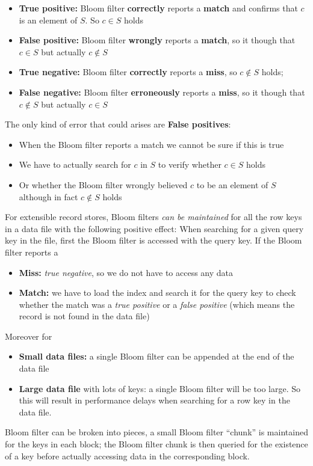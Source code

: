 \begin{itemize}
    \item \textbf{True positive:} Bloom filter \textbf{correctly} reports a \textbf{match} and confirms that \(c\) is an element of \(S\). So \(c \in S\) holds
    \item \textbf{False positive:} Bloom filter \textbf{wrongly} reports a \textbf{match}, so it though that\(c \in S\) but actually \(c \notin S\)
    \item \textbf{True negative:} Bloom filter \textbf{correctly} reports a \textbf{miss}, so \(c \notin S\) holds;
    \item \textbf{False negative:} Bloom filter \textbf{erroneously} reports a \textbf{miss}, so it though that\(c \notin S\) but actually \(c \in S\)
\end{itemize}
The only kind of error that could arises are \textbf{False positives}:
\begin{itemize}
    \item When the Bloom filter reports a match we cannot be sure if this is true
    \item We have to actually search for \(c\) in \(S\) to verify whether \(c \in S\) holds
    \item Or whether the Bloom filter wrongly believed \(c\) to be an element of \(S\) although in fact \(c \notin S\) holds
\end{itemize}

For extensible record stores, Bloom filters \textit{can be maintained} for all the row keys in a data file with the following positive effect:
When searching for a given query key in the file, first the Bloom filter is accessed with the query key. If the Bloom filter reports a
\begin{itemize}
    \item \textbf{Miss:} \textit{true negative}, so we do not have to access any data
    \item \textbf{Match:} we have to load the index and search it for the query key to check whether the match was a \textit{true positive} or a \textit{false positive} (which means the record is not found in the data file)
\end{itemize}
Moreover for
\begin{itemize}
    \item \textbf{Small data files:} a single Bloom filter can be appended at the end of the data file
    \item \textbf{Large data file} with lots of keys: a single Bloom filter will be too large. So this will result in performance delays when searching for a row key in the data file.
\end{itemize}
Bloom filter can be broken into pieces, a small Bloom filter “chunk” is maintained for the keys in each block; the Bloom filter chunk is then queried for the existence of a key before actually accessing data in the corresponding block.

